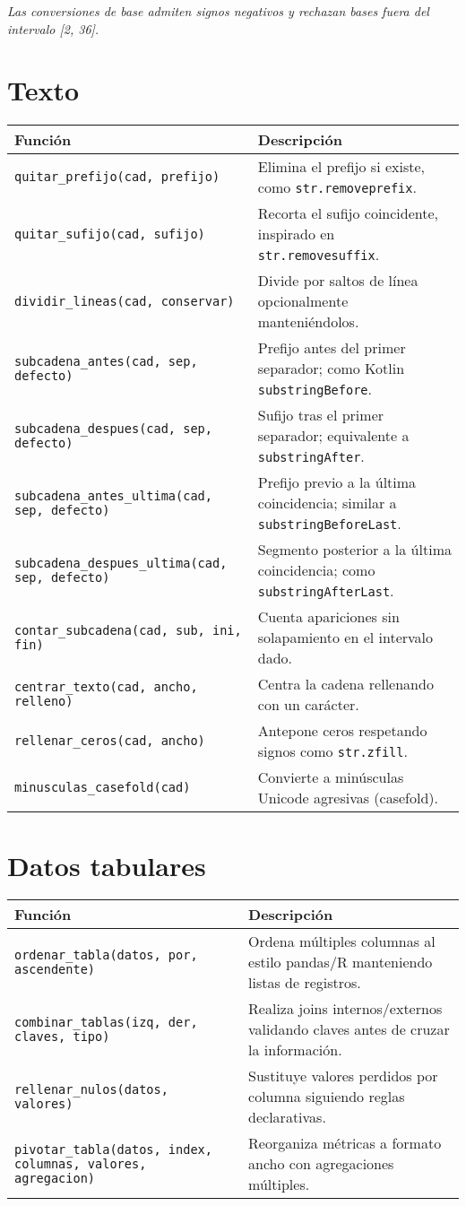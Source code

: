 \documentclass{article}
\begin{document}
\textit{Las conversiones de base admiten signos negativos y rechazan bases fuera del intervalo [2, 36].}

\section*{Texto}
\begin{tabular}{ll}
\textbf{Función} & \textbf{Descripción}\\\hline
\texttt{quitar\_prefijo(cad, prefijo)} & Elimina el prefijo si existe, como \texttt{str.removeprefix}.\\
\texttt{quitar\_sufijo(cad, sufijo)} & Recorta el sufijo coincidente, inspirado en \texttt{str.removesuffix}.\\
\texttt{dividir\_lineas(cad, conservar)} & Divide por saltos de línea opcionalmente manteniéndolos.\\
\texttt{subcadena\_antes(cad, sep, defecto)} & Prefijo antes del primer separador; como Kotlin \texttt{substringBefore}.\\
\texttt{subcadena\_despues(cad, sep, defecto)} & Sufijo tras el primer separador; equivalente a \texttt{substringAfter}.\\
\texttt{subcadena\_antes\_ultima(cad, sep, defecto)} & Prefijo previo a la última coincidencia; similar a \texttt{substringBeforeLast}.\\
\texttt{subcadena\_despues\_ultima(cad, sep, defecto)} & Segmento posterior a la última coincidencia; como \texttt{substringAfterLast}.\\
\texttt{contar\_subcadena(cad, sub, ini, fin)} & Cuenta apariciones sin solapamiento en el intervalo dado.\\
\texttt{centrar\_texto(cad, ancho, relleno)} & Centra la cadena rellenando con un carácter.\\
\texttt{rellenar\_ceros(cad, ancho)} & Antepone ceros respetando signos como \texttt{str.zfill}.\\
\texttt{minusculas\_casefold(cad)} & Convierte a minúsculas Unicode agresivas (casefold).\\
\end{tabular}

\section*{Datos tabulares}
\begin{tabular}{ll}
\textbf{Función} & \textbf{Descripción}\\\hline
\texttt{ordenar\_tabla(datos, por, ascendente)} & Ordena múltiples columnas al estilo pandas/R manteniendo listas de registros.\\
\texttt{combinar\_tablas(izq, der, claves, tipo)} & Realiza joins internos/externos validando claves antes de cruzar la información.\\
\texttt{rellenar\_nulos(datos, valores)} & Sustituye valores perdidos por columna siguiendo reglas declarativas.\\
\texttt{pivotar\_tabla(datos, index, columnas, valores, agregacion)} & Reorganiza métricas a formato ancho con agregaciones múltiples.\\
\end{tabular}
\end{document}
